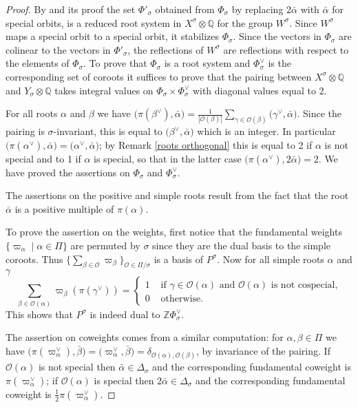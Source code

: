 \documentclass{amsart}
\numberwithin{equation}{section}
\theoremstyle{definition}
\theoremstyle{remark}
\newcommand\BQ{{\mathbb Q}}
\newcommand\BZ{{\mathbb Z}}
\newcommand\CO{{\mathcal O}}
\newcommand\pairing[2]{{\mathopen(#1,#2\mathclose)}}
\begin{document}
\begin{proof}
By  \cite[2.3]{qss} and its proof
the  set $\Phi'_\sigma$  obtained from $\Phi_\sigma$ by
replacing  $2\bar\alpha$ with $\bar\alpha$  for special orbits,  is a reduced
root system in $X^\sigma\otimes\BQ$ for the group $W^\sigma$.
Since $W^\sigma$  maps a special  orbit to a special
orbit,  it  stabilizes  $\Phi_\sigma$. Since the vectors in $\Phi_\sigma$ are 
colinear to the vectors in $\Phi'_\sigma$, the reflections of $W^\sigma$ are
reflections with respect to the elements of $\Phi_\sigma$.
To  prove  that $\Phi_\sigma$ is a root
system  and  $\Phi_\sigma^\vee$  is  the  corresponding  set  of coroots it
suffices to prove that the
pairing between $X^\sigma\otimes\BQ$ and $Y_\sigma\otimes\BQ$ takes
integral values on $\Phi_\sigma\times\Phi_\sigma^\vee$ with diagonal values
equal to 2.

For  all  roots  $\alpha$  and  $\beta$ we have $\pairing{\pi(\beta^\vee)}
{\bar\alpha}
=\frac1{|\CO(\beta)|}\sum_{\gamma\in \CO(\beta)}\pairing{\gamma^\vee}
{\bar\alpha}$.
Since the  pairing is $\sigma$-invariant, this is equal
to  $\pairing{\beta^\vee}{\bar\alpha}$ which is an integer. In particular
$\pairing{\pi(\alpha^\vee)}{\bar\alpha}=\pairing{\alpha^\vee}{\bar\alpha}$;
by Remark \ref{roots orthogonal} this is equal to
2 if $\alpha$ is not special and to 1 if $\alpha$ is special, so that in the
latter case $\pairing{\pi(\alpha^\vee)}{2\bar\alpha}=2$.
We have proved the assertions
on $\Phi_\sigma$ and $\Phi_\sigma^\vee$.

The assertions on the positive and simple roots result from the fact that the
root $\bar\alpha$ is a positive multiple of $\pi(\alpha)$.

To  prove the assertion  on the weights,  first notice that the fundamental
weights  $\{\varpi_\alpha\mid \alpha\in\Pi\}$  are permuted  by $\sigma$
since they are the dual basis to the simple coroots. Thus
$\{\sum_{\beta\in\CO}\varpi_\beta\}_{\CO\in\Pi/\sigma}$   is  a   basis  of
$P^\sigma$. Now
for all simple roots $\alpha$ and $\gamma$
$$\sum_{\beta\in\CO(\alpha)}\varpi_\beta(\pi(\gamma^\vee))=     \begin{cases}
1&\mbox{  if $\gamma\in\CO(\alpha)$ and  $\CO(\alpha)$ is not cospecial,}\\
0&  \mbox{ otherwise.} \end{cases} $$ This shows that $P^\sigma$ is
indeed dual to $\BZ\Phi_\sigma^\vee$.

The assertion on coweights comes from a similar computation: 
for $\alpha,\beta\in\Pi$ we have
$\pairing{\pi(\varpi_\alpha^\vee)}{\bar\beta}=\pairing{\varpi_\alpha^\vee}
{\bar\beta}=
\delta_{\CO(\alpha),\CO(\beta)}$, by invariance of the pairing. If $\CO(\alpha)$ is not
special then $\bar\alpha\in\Delta_\sigma$ and the corresponding fundamental coweight
is $\pi(\varpi^\vee_\alpha)$; if $\CO(\alpha)$ is special then $2\bar\alpha\in\Delta_\sigma$
and the corresponding fundamental coweight is $\frac12\pi(\varpi^\vee_\alpha)$.
\end{proof}
\end{document}
